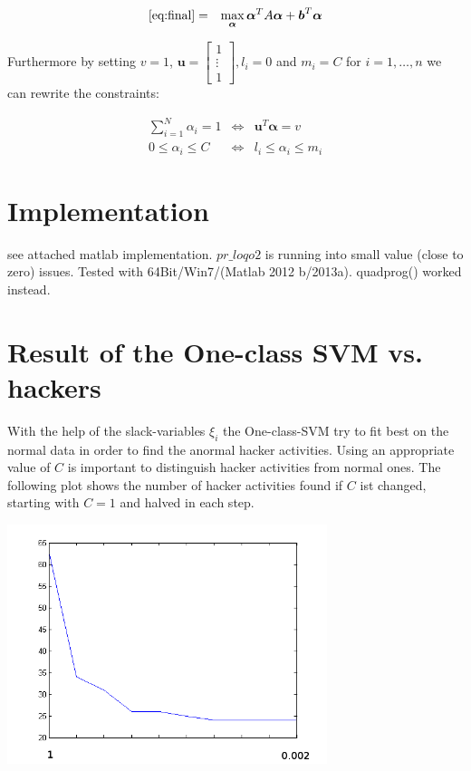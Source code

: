 \documentclass[a4paper, 12pt, titlepage]{article}
\begin{document}
\begin{eqnarray*}
	\eqref{eq:final} &=& \max_{\boldsymbol{\alpha}} \boldsymbol{\alpha}^TA\boldsymbol{\alpha} + \boldsymbol{b}^T\boldsymbol{\alpha}
\end{eqnarray*}

Furthermore by setting $v=1$, $\boldsymbol{u} = \begin{bmatrix}1\\ \vdots \\ 1\end{bmatrix}, l_i = 0$ and $m_i=C$ for $i=1,\ldots,n$ we can rewrite the constraints:

\begin{eqnarray*}
	\sum_{i=1}^N \alpha_i = 1 &\Leftrightarrow& \boldsymbol{u}^T\boldsymbol{\alpha} = v\\
	0 \le \alpha_i \le C &\Leftrightarrow& l_i \le \alpha_i \le m_i
\end{eqnarray*}

\section{Implementation} see attached matlab implementation. \newline
$pr\_loqo2$ is running into small value (close to zero) issues. Tested with 64Bit/Win7/(Matlab 2012 b/2013a). quadprog() worked instead.

\section{Result of the One-class SVM vs. hackers}

With the help of the slack-variables $\xi_i$ the One-class-SVM try to fit best on the normal data in order to find the anormal hacker activities. Using an appropriate value of $C$ is important to distinguish hacker activities from normal ones.
The following plot shows the number of hacker activities found if $C$ ist changed, starting with $C=1$ and halved in each step.

\includegraphics[width=0.7\textwidth]{images/plot_found_hackers.png}
\end{document}
